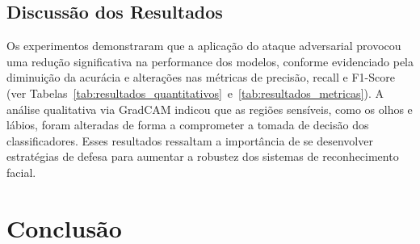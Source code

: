 \documentclass[12pt]{article}
\begin{document}
\subsection{Discussão dos Resultados}
Os experimentos demonstraram que a aplicação do ataque adversarial provocou uma
redução significativa na performance dos modelos, conforme evidenciado pela
diminuição da acurácia e alterações nas métricas de precisão, recall e F1-Score
(ver
Tabelas~\ref{tab:resultados_quantitativos}~e~\ref{tab:resultados_metricas}). A
análise qualitativa via GradCAM indicou que as regiões sensíveis, como os olhos
e lábios, foram alteradas de forma a comprometer a tomada de decisão dos
classificadores. Esses resultados ressaltam a importância de se desenvolver
estratégias de defesa para aumentar a robustez dos sistemas de reconhecimento
facial.

\section{Conclusão}



\nocite{*}
\end{document}
